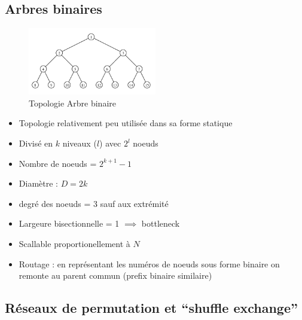\documentclass[12pt,a4paper,oneside, titlepage]{article}
\begin{document}
    \subsection*{Arbres binaires}

      \begin{figure}[H]
        \centering
        \includegraphics[width=0.5\textwidth]{images/tree}
        \caption{Topologie Arbre binaire}
      \end{figure}

      \begin{itemize}
        \item Topologie relativement peu utilisée dans sa forme statique
        \item Divisé en $k$ niveaux ($l$) avec $2^l$ noeuds
        \item Nombre de noeuds = $2^{k + 1}-1$
        \item Diamètre : $D = 2k$
        \item degré des noeuds = 3 sauf aux extrémité
        \item Largeure bisectionnelle = 1 $\implies$ bottleneck
        \item Scallable proportionellement à $N$
        \item Routage : en représentant les numéros de noeuds sous forme binaire on remonte au parent commun (prefix binaire similaire)
      \end{itemize}

    \subsection*{Réseaux de permutation et “shuffle exchange”}
\end{document}
